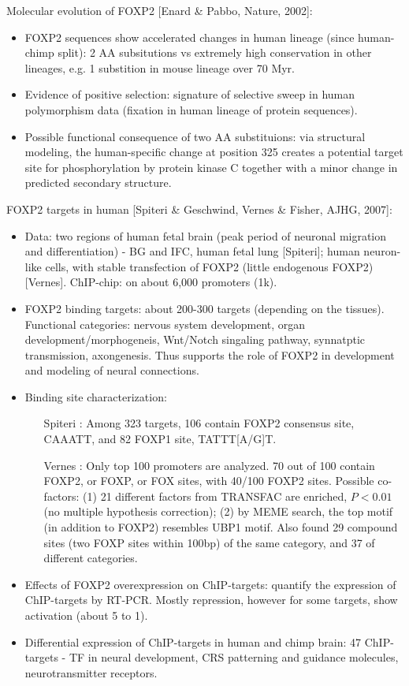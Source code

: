 \documentclass{report}
\begin{document}
Molecular evolution of FOXP2 [Enard \& Pabbo, Nature, 2002]: 
\begin{itemize}
	\item FOXP2 sequences show accelerated changes in human lineage (since human-chimp split): 2 AA subsitutions vs extremely high conservation in other lineages, e.g. 1 substition in mouse lineage over 70 Myr. 
	\item Evidence of positive selection: signature of selective sweep in human polymorphism data (fixation in human lineage of protein sequences). 
	\item Possible functional consequence of two AA substituions: via structural modeling, the human-specific change at position 325 creates a potential target site for phosphorylation by protein kinase C together with a minor change in predicted secondary structure.
\end{itemize}

FOXP2 targets in human [Spiteri \& Geschwind, Vernes \& Fisher, AJHG, 2007]: 
\begin{itemize}
	\item Data: two regions of human fetal brain (peak period of neuronal migration and differentiation) - BG and IFC, human fetal lung [Spiteri]; human neuron-like cells, with stable transfection of FOXP2 (little endogenous FOXP2) [Vernes]. ChIP-chip: on about 6,000 promoters (1k).
	
	\item FOXP2 binding targets: about 200-300 targets (depending on the tissues). Functional categories: nervous system development, organ development/morphogeneis, Wnt/Notch singaling pathway, synnatptic transmission, axongenesis. Thus supports the role of FOXP2 in development and modeling of neural connections. 
	
	\item Binding site characterization: 
	\begin{itemize}
		\item [Spiteri]: Among 323 targets, 106 contain FOXP2 consensus site, CAAATT, and 82 FOXP1 site, TATTT[A/G]T. 
		\item [Vernes]: Only top 100 promoters are analyzed. 70 out of 100 contain FOXP2, or FOXP, or FOX sites, with 40/100 FOXP2 sites. Possible co-factors: (1) 21 different factors from TRANSFAC are enriched, $P < 0.01$ (no multiple hypothesis correction); (2) by MEME search, the top motif (in addition to FOXP2) resembles UBP1 motif. Also found 29 compound sites (two FOXP sites within 100bp) of the same category, and 37 of different categories.
	\end{itemize}
	
	\item Effects of FOXP2 overexpression on ChIP-targets: quantify the expression of ChIP-targets by RT-PCR. Mostly repression, however for some targets, show activation (about 5 to 1).
	
	\item Differential expression of ChIP-targets in human and chimp brain: 47 ChIP-targets - TF in neural development, CRS patterning and guidance molecules, neurotransmitter receptors. 
\end{itemize}
\end{document}

